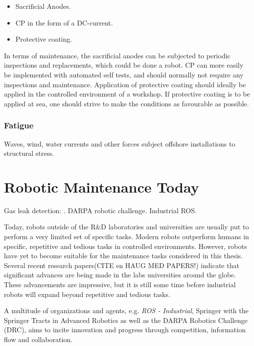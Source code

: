 \begin{itemize}
	\item Sacrificial Anodes.
	\item \ac{CP} in the form of a DC-current.
	\item Protective coating.
\end{itemize} 

In terms of maintenance, the sacrificial anodes can be subjected to periodic inspections and replacements, which could be done a robot. \ac{CP} can more easily be implemented with automated self tests, and should normally not require any inspections and maintenance\cite{ElReedy2012383}. Application of protective coating should ideally be applied in the controlled environment of a workshop. If protective coating is to be applied at sea, one should strive to make the conditions as favourable as possible.

\subsubsection{Fatigue}

Waves, wind, water currents and other forces subject offshore installations to structural stress.

\section{Robotic Maintenance Today}

Gas leak detection: \cite{FSR2014_gas_leak}. DARPA robotic challenge. Industrial ROS.

Today, robots outside of the R\&D laboratories and universities are usually put to perform a very limited set of specific tasks. Modern robots outperform humans in specific, repetitive and tedious tasks in controlled environments. However, robots have yet to become suitable for the maintenance tasks considered in this thesis. Several recent research papers(CITE en HAUG MED PAPERS!) indicate that significant advances are being made in the labs universities around the globe. These advancements are impressive, but it is still some time before industrial robots will expand beyond repetitive and tedious tasks\cite{ifr_statistics}. 

A multitude of organizations and agents, e.g. \textit{ROS - Industrial}\cite{ROS_industrial}, Springer with the Springer Tracts in Advanced Robotics as well as the DARPA Robotics Challenge (DRC)\cite{DRC}, aims to incite innovation and progress through competition, information flow and collaboration.

